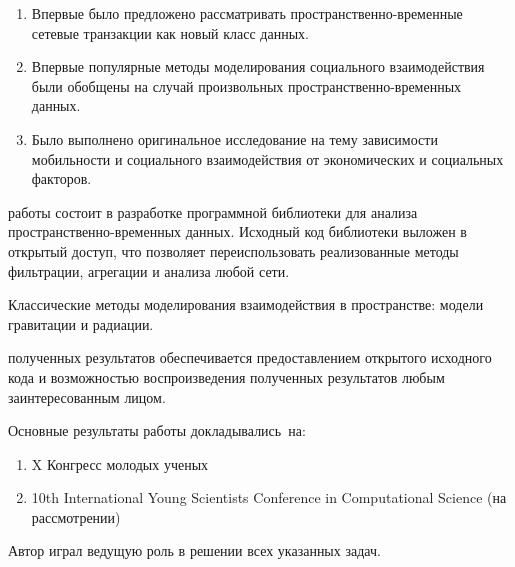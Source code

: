 {\novelty}
\begin{enumerate}[beginpenalty=10000] 
  \item Впервые было предложено рассматривать пространственно-временные сетевые транзакции как новый класс данных.
  \item Впервые популярные методы моделирования социального взаимодействия были обобщены на случай произвольных пространственно-временных данных. 
  \item Было выполнено оригинальное исследование на тему зависимости мобильности и социального взаимодействия от экономических и социальных факторов.
\end{enumerate}


{\influence} работы состоит в разработке программной библиотеки для анализа пространственно-временных данных. Исходный код библиотеки выложен в открытый доступ, что позволяет переиспользовать реализованные методы фильтрации, агрегации и анализа любой сети. 

{\methods}
Классические методы моделирования взаимодействия в пространстве: модели гравитации и радиации.


{\reliability} полученных результатов обеспечивается предоставлением открытого исходного кода и возможностью воспроизведения полученных результатов любым заинтересованным лицом.

{\probation}
Основные результаты работы докладывались~на:
\begin{enumerate}[beginpenalty=10000]
  \item X Конгресс молодых ученых
  \item 10th International Young Scientists Conference in Computational Science (на рассмотрении)
\end{enumerate}

{\contribution} Автор играл ведущую роль в решении всех указанных задач.
